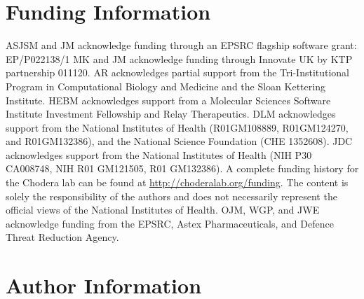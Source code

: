 \documentclass[9pt,bestpractices]{livecoms}
\begin{document}
\section*{Funding Information}
ASJSM and JM acknowledge funding through an EPSRC flagship software grant: EP/P022138/1
MK and JM acknowledge funding through Innovate UK by KTP partnership 011120.
AR acknowledges partial support from the Tri-Institutional Program in Computational Biology and Medicine and the Sloan Kettering Institute.
HEBM acknowledges support from a Molecular Sciences Software Institute Investment Fellowship and Relay Therapeutics.
DLM acknowledges support from the National Institutes of Health (R01GM108889, R01GM124270, and R01GM132386), and the National Science Foundation (CHE 1352608).
JDC acknowledges support from the National Institutes of Health (NIH P30 CA008748, NIH R01 GM121505, R01 GM132386).
A complete funding history for the Chodera lab can be found at \url{http://choderalab.org/funding}.
The content is solely the responsibility of the authors and does not necessarily represent the official views of the National Institutes of Health.
OJM, WGP, and JWE acknowledge funding from the EPSRC, Astex Pharmaceuticals, and Defence Threat Reduction Agency.


\section*{Author Information}
\makeorcid



\end{document}
